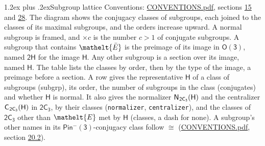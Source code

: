 \documentclass[10pt,a4paper]{article}
\makeatletter
\renewcommand\section{\@startsection{section}{1}{\z@}{-3ex plus -1ex minus -.2ex}%
  {1.2ex plus .2ex}{\normalfont\large\sffamily\bfseries\color{parttitle}}}
\numberwithin{equation}{section}
\newcommand{\eltfont}[1]{{\let\sigma\eltsigma\mathelt{#1}}}
\newcommand{\grp}[1]{\mathsf{#1}}
\newcommand{\cls}[1]{\eltfont{#1}}
\newcommand{\elt}[1]{\eltfont{#1}}
\newcommand{\samecls}{\cong}
\newcommand{\barred}[1]{\bar{#1}}
\newcommand{\hairsp}{\mkern1mu}
\makeatother
\begin{document}
\section{Subgroup lattice}\label{s:subgroups}
Conventions: \href{../../CONVENTIONS.pdf}{CONVENTIONS.pdf}, sections \href{../../../rotation/CONVENTIONS.pdf\#conv.15}{15} and \href{../../CONVENTIONS.pdf\#conv.28}{28}.
The diagram shows the conjugacy classes of subgroups, each joined to the classes of its maximal subgroups, and the orders increase upward. \label{n:index.conjugates.c}A normal subgroup is framed, and ${\times}c$ is the number $c > 1$ of conjugate subgroups. \label{n:group.H}A subgroup that contains $\elt{\barred{E}}$ is the preimage of its image in $\grp{O(3)}$, named $\grp{2H}$ for the image $\grp{H}$. Any other subgroup is a section over its image, named $\grp{H}$. The table lists the classes by order, then by the type of the image, a preimage before a section. \label{n:head.subgroup}\label{n:head.order}\label{n:head.conjugates}\label{n:head.normal}A row gives the representative $\grp{H}$ of a class of subgroups (subgrp), its order, the number of subgroups in the class (conjugates) and whether $\grp{H}$ is normal. \label{n:group.normalizer}\label{n:group.centralizer}\label{n:head.classes}It also gives the normalizer $\grp{N}_{\hairsp \grp{2C_{3}}}(\grp{H})$ and the centralizer $\grp{C}_{\hairsp \grp{2C_{3}}}(\grp{H})$ in $\grp{2C_{3}}$, by their classes (\texttt{normalizer}, \texttt{centralizer}), and the classes of $\grp{2C_{3}}$ other than $\cls{E}$ met by $\grp{H}$ (classes, a dash for none). A subgroup's other names in its \href{Pinminus3.pdf}{$\grp{Pin^{-}(3)}$}-conjugacy class follow $\samecls$ (\href{../../CONVENTIONS.pdf}{CONVENTIONS.pdf}, section \href{../../CONVENTIONS.pdf\#conv.20.2}{20.2}).
\begin{center}
\end{center}
\end{document}
